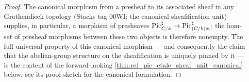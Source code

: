 \begin{proof}




\leanok
  The canonical morphism from a presheaf to its associated sheaf in
  any Grothendieck topology (Stacks tag 00WI; the canonical
  sheafification unit) supplies, in particular, a morphism of
  presheaves \(\operatorname{Pic}^\sharp_{C/k} \to \operatorname{Pic}^\sharp_{(C/k)\mathrm{\acute{e}t}}\); the
  hom-set of presheaf morphisms between these two objects is therefore
  nonempty. The full universal property of this canonical morphism
  --- and consequently the claim that the abelian-group structure on
  the sheafification is uniquely pinned by it --- is the content of
  the forward-looking \cref{thm:rel_pic_etale_sheaf_unit_canonical}
  below; see its proof sketch for the canonical formulation.
\end{proof}

